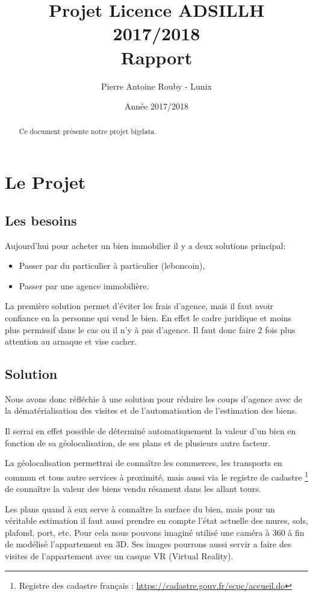 \documentclass[12pt]{report}
\title{Projet Licence ADSILLH 2017/2018\\Rapport}
\author{Pierre Antoine Rouby - Lunix}
\date{Année 2017/2018}
\begin{document}
\maketitle

\begin{abstract}
Ce document présente notre projet bigdata.
\end{abstract}

\tableofcontents

\chapter{Le Projet}
\section{Les besoins}
Aujourd'hui pour acheter un bien immobilier il y a deux solutions principal:
\begin{itemize}
\item Passer par du particulier à particulier (leboncoin),
\item Passer par une agence immobilière.
\end{itemize}
La première solution permet d'éviter les frais d'agence, mais il faut avoir
confiance en la personne qui vend le bien.
En effet le cadre juridique et moins plus permissif dans le cas ou il n'y à pas
d'agence.
Il faut donc faire 2 fois plus attention au arnaque et vise cacher.

\section{Solution}
Nous avons donc réfléchie à une solution pour réduire les coups d'agence avec
de la dématérialisation des visites et de l'automatisation de l'estimation des
biens.

Il serrai en effet possible de déterminé automatiquement la valeur d'un bien
en fonction de sa géolocalisation, de ses plans et de plusieurs autre facteur.

La géolocalisation permettrai de connaître les commerces, les transports en commun
et tous autre services à proximité, mais aussi via le registre de cadastre
\footnote{Registre des cadastre français : \url{https://cadastre.gouv.fr/scpc/accueil.do}}
de connaître la valeur des biens vendu résament dans les allant tours.

Les plans quand à eux serve à connaître la surface du bien, mais pour un véritable
estimation il faut aussi prendre en compte l'état actuelle des mures, sols,
plafond, port, etc. Pour cela nous pouvons imaginé utilisé une caméra à 360 à
fin de modélisé l'appartement en 3D. Ses images pourrons aussi servir a faire des
visites de l'appartement avec un casque VR (Virtual Reality).
\end{document}
